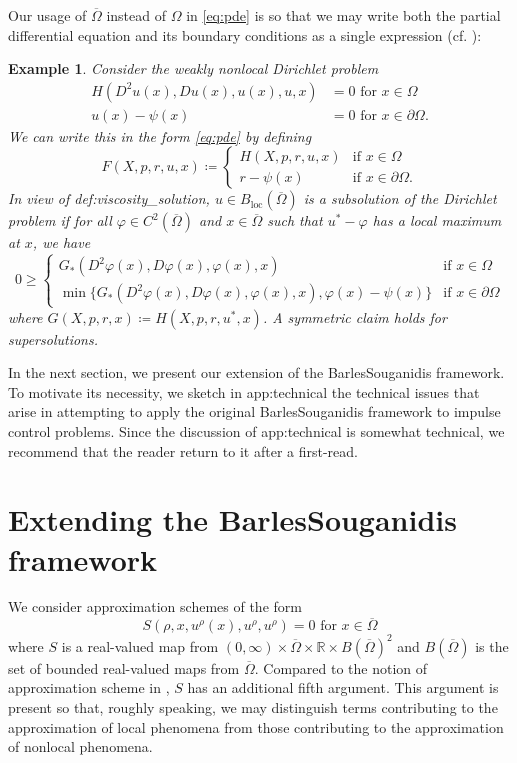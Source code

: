 \documentclass[12pt]{article}
\newcounter{dummy}
\newtheorem{example}[dummy]{Example}
\begin{document}
Our usage of $\overline{\Omega}$
instead of $\Omega$ in \eqref{eq:pde} is so that we may write both the partial differential
equation and its boundary conditions as a single expression (cf. \cite{MR1115933}):

\begin{example}Consider the weakly nonlocal\emph{ }Dirichlet problem
\begin{align*}
H(D^{2}u(x),Du(x),u(x),u,x) & =0\text{ for }x\in\Omega\\
u(x)-\psi(x) & =0\text{ for }x\in\partial\Omega.
\end{align*}
We can write this in the form \eqref{eq:pde} by defining
\[
F(X,p,r,u,x)\coloneqq\begin{cases}
H(X,p,r,u,x) & \text{if }x\in\Omega\\
r-\psi(x) & \text{if }x\in\partial\Omega.
\end{cases}
\]
In view of {\prettyref}{def:viscosity_solution}, $u\in B_{\operatorname{loc}}(\overline{\Omega})$
is a subsolution of the Dirichlet problem if for all $\varphi\in C^{2}(\overline{\Omega})$
and $x\in\overline{\Omega}$ such that $u^{*}-\varphi$ has a local
maximum at $x$, we have
\[
0{\geqslant}\begin{cases}
G_{*}(D^{2}\varphi(x),D\varphi(x),\varphi(x),x) & \text{if }x\in\Omega\\
\min\{G_{*}(D^{2}\varphi(x),D\varphi(x),\varphi(x),x),\varphi(x)-\psi(x)\} & \text{if }x\in\partial\Omega
\end{cases}
\]
where $G(X,p,r,x)\coloneqq H(X,p,r,u^{*},x)$. A symmetric claim holds
for supersolutions.\end{example}

In the next section, we present our extension of the Barles\textendash Souganidis
framework. To motivate its necessity, we sketch in {\prettyref}{app:technical}
the technical issues that arise in attempting to apply the original
Barles\textendash Souganidis framework to impulse control problems.
Since the discussion of {\prettyref}{app:technical} is somewhat technical,
we recommend that the reader return to it after a first-read.

\section{\label{sec:convergence_result}Extending the Barles\textendash Souganidis framework}

We consider approximation schemes of the form
\begin{equation}
S(\rho,x,u^{\rho}(x),u^{\rho},u^{\rho})=0\text{ for }x\in\overline{\Omega}\label{eq:scheme}
\end{equation}
where $S$ is a real-valued map from $(0,\infty)\times\overline{\Omega}\times\mathbb{R}\times B(\overline{\Omega})^{2}$
and $B(\overline{\Omega})$ is the set of bounded real-valued maps
from $\overline{\Omega}$. Compared to the notion of approximation
scheme in \cite[Eq. (2.1)]{MR1115933}, $S$ has an additional fifth
argument. This argument is present so that, roughly speaking,
we may distinguish terms contributing to the approximation of local
phenomena from those contributing to the approximation of nonlocal
phenomena.
\end{document}
